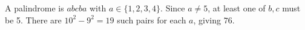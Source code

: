 A palindrome is $abcba$ with $a\in\{1,2,3,4\}$. Since $a\ne5$, at least one of $b,c$ must be 5. There are $10^2-9^2=19$ such pairs for each $a$, giving $\boxed{76}$.
